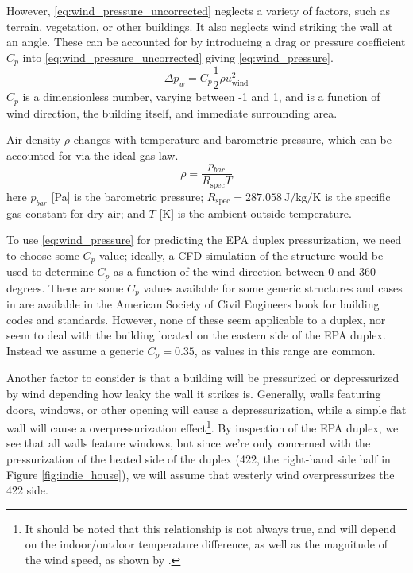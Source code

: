 However, \eqref{eq:wind_pressure_uncorrected} neglects a variety of factors, such as terrain, vegetation, or other buildings.
It also neglects wind striking the wall at an angle.
These can be accounted for by introducing a drag or pressure coefficient $C_p$ into \eqref{eq:wind_pressure_uncorrected} giving \eqref{eq:wind_pressure}.
\begin{equation}\label{eq:wind_pressure}
  \Delta p_w = C_p \frac{1}{2} \rho u_\mathrm{wind}^2
\end{equation}
$C_p$ is a dimensionless number, varying between -1 and 1, and is a function of wind direction, the building itself, and immediate surrounding area.\par

Air density $\rho$ changes with temperature and barometric pressure, which can be accounted for via the ideal gas law.
\begin{equation}
  \rho = \frac{p_{bar}}{R_\mathrm{spec} T}
\end{equation}
here $p_{bar}$ [\si{\pascal}] is the barometric pressure;
$R_\mathrm{spec} = \SI{287.058}{\joule\per\kilogram\per\kelvin}$ is the specific gas constant for dry air;
and $T$ [\si{\kelvin}] is the ambient outside temperature.\par

To use \eqref{eq:wind_pressure} for predicting the EPA duplex pressurization, we need to choose some $C_p$ value; ideally, a CFD simulation of the structure would be used to determine $C_p$ as a function of the wind direction between 0 and 360 degrees.
There are some $C_p$ values available for some generic structures and cases in are available in the American Society of Civil Engineers book for building codes and standards\cite{simiu_design_nodate}.
However, none of these seem applicable to a duplex, nor seem to deal with the building located on the eastern side of the EPA duplex.
Instead we assume a generic $C_p = 0.35$, as values in this range are common.

Another factor to consider is that a building will be pressurized or depressurized by wind depending how leaky the wall it strikes is.
Generally, walls featuring doors, windows, or other opening will cause a depressurization, while a simple flat wall will cause a overpressurization effect\footnote{
It should be noted that this relationship is not always true, and will depend on the indoor/outdoor temperature difference, as well as the magnitude of the wind speed, as shown by \citeauthor{shirazi_three-dimensional_2017}\cite{shirazi_three-dimensional_2017}.
}.
By inspection of the EPA duplex, we see that all walls feature windows, but since we're only concerned with the pressurization of the heated side of the duplex (422, the right-hand side half in Figure \eqref{fig:indie_house}), we will assume that westerly wind overpressurizes the 422 side.\par

